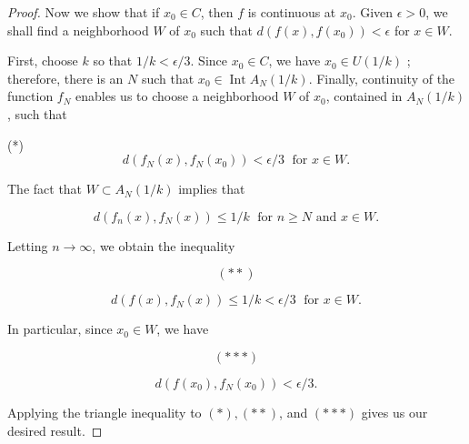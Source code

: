 \begin{proof}
Now we show that if \(x_{0} \in C\), then \(f\) is continuous at \(x_{0}\). Given \(\epsilon > 0\), we shall find a neighborhood \(W\) of \(x_{0}\) such that \(d({f(x),f(x_{0}) }) < \epsilon\) for \(x \in W\).

First, choose \(k\) so that \(1/k < \epsilon /3\). Since \(x_{0} \in C\), we have \(x_{0} \in U({1/k})\) ; therefore, there is an \(N\) such that \(x_{0} \in \operatorname{Int}A_{N}({1/k})\). Finally, continuity of the function \(f_{N}\) enables us to choose a neighborhood \(W\) of \(x_{0}\), contained in \(A_{N}({1/k})\), such that

(*)
\[
d({f_{N}(x),f_{N}(x_{0}) }) < \epsilon /3\;\text{ for }x \in W.
\]

The fact that \(W \subset {A}_{N}({1/k})\) implies that

\[
d({f_{n}(x),f_{N}(x) }) \leq 1/k\;\text{ for }n \geq N\text{ and }x \in W.
\]

Letting \(n \rightarrow \infty\), we obtain the inequality

\[
({* * })
\]

\[
d({f(x),f_{N}(x) }) \leq 1/k < \epsilon /3\;\text{ for }x \in W.
\]

In particular, since \(x_{0} \in W\), we have

\[
({* * * })
\]

\[
d({f(x_{0}),f_{N}(x_{0}) }) < \epsilon /3.
\]

Applying the triangle inequality to \(( *),({* * })\), and \(({* * * })\) gives us our desired result.
\end{proof}

